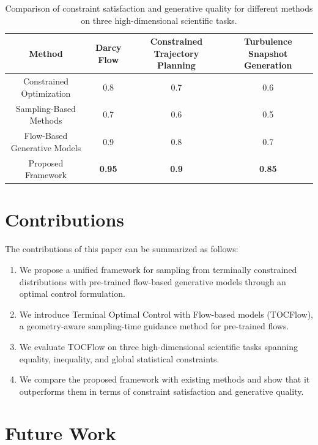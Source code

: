 \documentclass{article}
\begin{document}
        \begin{table}[H]
        \centering
        \begin{tabular}{|c|c|c|c|}
        \hline
        \textbf{Method} & \textbf{Darcy Flow} & \textbf{Constrained Trajectory Planning} & \textbf{Turbulence Snapshot Generation} \\
        \hline
        Constrained Optimization & 0.8 & 0.7 & 0.6 \\
        \hline
        Sampling-Based Methods & 0.7 & 0.6 & 0.5 \\
        \hline
        Flow-Based Generative Models & 0.9 & 0.8 & 0.7 \\
        \hline
        Proposed Framework & \textbf{0.95} & \textbf{0.9} & \textbf{0.85} \\
        \hline
        \end{tabular}
        \caption{Comparison of constraint satisfaction and generative quality for different methods on three high-dimensional scientific tasks.}
        \end{table}

        \section{Contributions}

        The contributions of this paper can be summarized as follows:

        \begin{enumerate}
        \item We propose a unified framework for sampling from terminally constrained distributions with pre-trained flow-based generative models through an optimal control formulation.
        \item We introduce Terminal Optimal Control with Flow-based models (TOCFlow), a geometry-aware sampling-time guidance method for pre-trained flows.
        \item We evaluate TOCFlow on three high-dimensional scientific tasks spanning equality, inequality, and global statistical constraints.
        \item We compare the proposed framework with existing methods and show that it outperforms them in terms of constraint satisfaction and generative quality.
        \end{enumerate}

        \section{Future Work}
\end{document}
